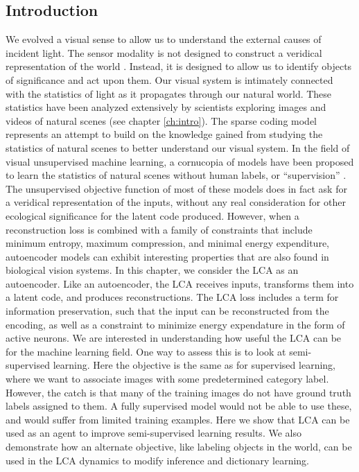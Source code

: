 \subsection{Introduction}
We evolved a visual sense to allow us to understand the external causes of incident light. The sensor modality is not designed to construct a veridical representation of the world \parencite{gollisch2010eye}. Instead, it is designed to allow us to identify objects of significance and act upon them. Our visual system is intimately connected with the statistics of light as it propagates through our natural world. These statistics have been analyzed extensively by scientists exploring images and videos of natural scenes (see chapter \ref{ch:intro}). The sparse coding model represents an attempt to build on the knowledge gained from studying the statistics of natural scenes to better understand our visual system. In the field of visual unsupervised machine learning, a cornucopia of models have been proposed to learn the statistics of natural scenes without human labels, or ``supervision'' \parencite{baldi2012autoencoders, bengio2012unsupervised, goodfellow2016deep}. The unsupervised objective function of most of these models does in fact ask for a veridical representation of the inputs, without any real consideration for other ecological significance for the latent code produced. However, when a reconstruction loss is combined with a family of constraints that include minimum entropy, maximum compression, and minimal energy expenditure, autoencoder models can exhibit interesting properties that are also found in biological vision systems. In this chapter, we consider the LCA as an autoencoder. Like an autoencoder, the LCA receives inputs, transforms them into a latent code, and produces reconstructions. The LCA loss includes a term for information preservation, such that the input can be reconstructed from the encoding, as well as a constraint to minimize energy expendature in the form of active neurons. We are interested in understanding how useful the LCA can be for the machine learning field. One way to assess this is to look at semi-supervised learning. Here the objective is the same as for supervised learning, where we want to associate images with some predetermined category label. However, the catch is that many of the training images do not have ground truth labels assigned to them. A fully supervised model would not be able to use these, and would suffer from limited training examples. Here we show that LCA can be used as an agent to improve semi-supervised learning results. We also demonstrate how an alternate objective, like labeling objects in the world, can be used in the LCA dynamics to modify inference and dictionary learning.

